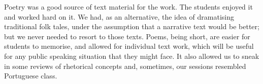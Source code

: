 \documentclass[article,twocolumn,twoside]{memoir}
\begin{document}
Poetry was a good source of text material for the work. The students enjoyed it
and worked hard on it. We had, as an alternative, the idea of dramatising
traditional folk tales, under the assumption that a narrative text would be
better; but we never needed to resort to those texts. Poems, being short, are
easier for students to memorise, and allowed for individual text work, which
will be useful for any public speaking situation that they might face. It also
allowed us to sneak in some reviews of rhetorical concepts and, sometimes, our
sessions resembled Portuguese class.
\end{document}
